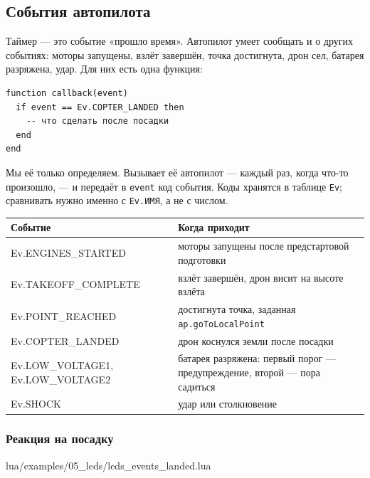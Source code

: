\subsection{События автопилота}

Таймер --- это событие «прошло время». Автопилот умеет сообщать и о других событиях: моторы запущены, взлёт завершён, точка достигнута, дрон сел, батарея разряжена, удар. Для них есть одна функция:

\begin{codebox}
\begin{verbatim}
function callback(event)
  if event == Ev.COPTER_LANDED then
    -- что сделать после посадки
  end
end
\end{verbatim}
\end{codebox}

Мы её только определяем. Вызывает её автопилот --- каждый раз, когда что-то произошло, --- и передаёт в \verb|event| код события. Коды хранятся в таблице \verb|Ev|; сравнивать нужно именно с \verb|Ev.ИМЯ|, а не с числом.

\begin{center}
\small
\begin{tabularx}{\linewidth}{@{}>{\ttfamily}l X@{}}
\toprule
\normalfont\textbf{Событие} & \textbf{Когда приходит} \\
\midrule
Ev.ENGINES\_STARTED & моторы запущены после предстартовой подготовки \\
Ev.TAKEOFF\_COMPLETE & взлёт завершён, дрон висит на высоте взлёта \\
Ev.POINT\_REACHED & достигнута точка, заданная \texttt{ap.goToLocalPoint} \\
Ev.COPTER\_LANDED & дрон коснулся земли после посадки \\
Ev.LOW\_VOLTAGE1, Ev.LOW\_VOLTAGE2 & батарея разряжена: первый порог --- предупреждение, второй --- пора садиться \\
Ev.SHOCK & удар или столкновение \\
\bottomrule
\end{tabularx}
\end{center}

\subsubsection*{Реакция на посадку}

\begin{codefile}{lua/examples/05_leds/leds_events_landed.lua}
\end{codefile}


